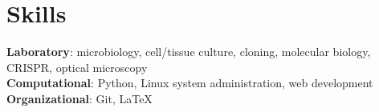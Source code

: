 \documentclass[letterpaper,11pt]{article}
\makeatletter
\newcommand{\entry}[3]{
  \vspace{-2pt}
  \item
    \begin{tabular*}
      {0.97\textwidth} %
      {l@{\extracolsep{\fill}}r} %
      {\small \textbf{#1} #2}  %
      & {\footnotesize{#3}} \\  %
    \end{tabular*}
    \vspace{-7pt}
}
\newcommand{\resumeItem}[1]{
  \item
  \begin{minipage}[t]{0.7\textwidth}
    \small #1 
  \end{minipage}
}
\newcommand{\resumeSubHeadingListStart}{
  \begin{itemize}[leftmargin=0.15in, label={}]
}
\newcommand{\resumeSubHeadingListEnd}{
  \end{itemize}
}
\newcommand{\resumeItemListStart}{
  \begin{itemize}[itemsep=.5pt]
}
\newcommand{\resumeItemListEnd}{
  \end{itemize}
  \vspace{-2pt}
}
\makeatother
\begin{document}





\section{Skills}

\resumeSubHeadingListStart
    \small{\item{
    \textbf{Laboratory}{: microbiology, cell/tissue culture, cloning, molecular biology, CRISPR, optical microscopy} \\
    \textbf{Computational}{: Python, Linux system administration, web development} \\
    \textbf{Organizational}{: Git, \LaTeX} \\}}
\resumeSubHeadingListEnd


\end{document}
